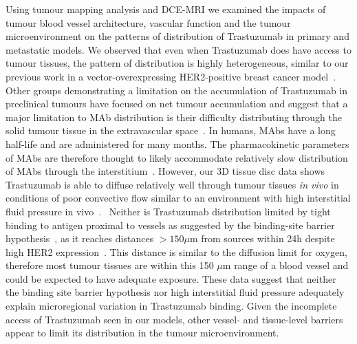 Using tumour mapping analysis and \acs{DCE-MRI} we examined the impacts of tumour blood vessel architecture, vascular function and the tumour microenvironment on the patterns of distribution of Trastuzumab in primary and metastatic models.
We observed that even when Trastuzumab does have access to tumour tissues, the pattern of distribution is highly heterogeneous, similar to our previous work in a vector-overexpressing \acs{HER2}-positive breast cancer model~\cite{Baker:2008ci}.
Other groups demonstrating a limitation on the accumulation of Trastuzumab in preclinical tumours have focused on net tumour accumulation and suggest that a major limitation to \acs{MAb} distribution is their difficulty distributing through the solid tumour tissue in the extravascular space~\cite{Jain:2010ie,Chauhan:2011fi,Lee:2010gb}.
In humans, \acs{MAbs} have a long half-life and are administered for many months.
The pharmacokinetic parameters of \acs{MAbs} are therefore thought to likely accommodate relatively slow distribution of \acs{MAbs} through the interstitium~\cite{Chauhan:2011fi,Thurber:2012dd}.
However, our 3D tissue disc data shows Trastuzumab is able to diffuse relatively well through tumour tissues \emph{in vivo} in conditions of poor convective flow similar to an environment with high interstitial fluid pressure in vivo~\cite{Baker:2018ex}.~
Neither is Trastuzumab distribution limited by tight binding to antigen proximal to vessels as suggested by the binding-site barrier hypothesis~\cite{Juweid:1992ty}, as it reaches distances $>150 \mu$m from sources within 24h despite high \acs{HER2} expression~\cite{Baker:2018ex}.
This distance is similar to the diffusion limit for oxygen, therefore most tumour tissues are within this 150 $\mu$m range of a blood vessel and could be expected to have adequate exposure.
These data suggest that neither the binding site barrier hypothesis nor high interstitial fluid pressure adequately explain microregional variation in Trastuzumab binding.
Given the incomplete access of Trastuzumab seen in our models, other vessel- and tissue-level barriers appear to limit its distribution in the tumour microenvironment.


